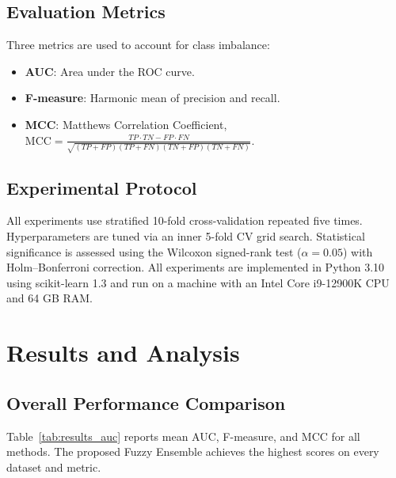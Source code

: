 \documentclass[10pt,twocolumn]{article}
\begin{document}
\subsection{Evaluation Metrics}

Three metrics are used to account for class imbalance:
\begin{itemize}
  \item \textbf{AUC}: Area under the ROC curve.
  \item \textbf{F-measure}: Harmonic mean of precision and recall.
  \item \textbf{MCC}: Matthews Correlation Coefficient,
    $\text{MCC} = \frac{TP \cdot TN - FP \cdot FN}{\sqrt{(TP+FP)(TP+FN)(TN+FP)(TN+FN)}}$.
\end{itemize}

\subsection{Experimental Protocol}

All experiments use stratified 10-fold cross-validation repeated five times. Hyperparameters
are tuned via an inner 5-fold CV grid search. Statistical significance is assessed using the
Wilcoxon signed-rank test ($\alpha = 0.05$) with Holm–Bonferroni correction. All experiments
are implemented in Python 3.10 using scikit-learn 1.3 and run on a machine with an Intel Core
i9-12900K CPU and 64 GB RAM.

\section{Results and Analysis}
\label{sec:results}

\subsection{Overall Performance Comparison}

Table~\ref{tab:results_auc} reports mean AUC, F-measure, and MCC for all methods.
The proposed Fuzzy Ensemble achieves the highest scores on every dataset and metric.
\end{document}

